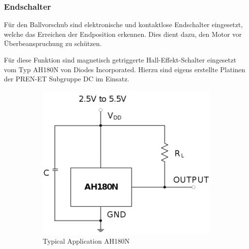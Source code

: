 \subsubsection{Endschalter}
Für den Ballvorschub sind elektronische und kontaktlose Endschalter
eingesetzt, welche das Erreichen der Endposition erkennen. 
Dies dient dazu, den Motor vor Überbeanspruchung zu schützen. 

Für diese Funktion sind magnetisch getriggerte Hall-Effekt-Schalter
eingesetzt vom Typ AH180N von Diodes Incorporated. Hierzu sind eigens
erstellte Platinen der PREN-ET Subgruppe DC im Einsatz.

\begin{figure}[h!]
	\centering
	\begin{subfigure}[b]{0.45\textwidth}
		\centering
		\includegraphics[width=1\textwidth]{../../fig/et/ah180n.png}
		\caption{Typical Application AH180N}
	\end{subfigure}
	\begin{subfigure}[b]{0.45\textwidth}
		\centering

\end{subfigure}
\end{figure}
